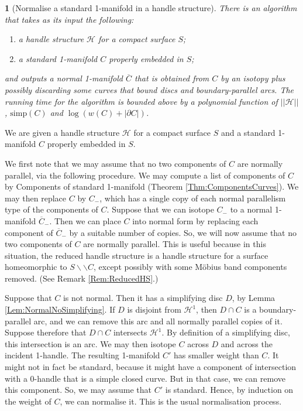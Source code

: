 \documentclass[oneside]{amsart}
\numberwithin{equation}{section}
\theoremstyle{plain}
\newtheorem*{namedtheorem}{\theoremname}
\newcommand{\theoremname}{testing}
\newenvironment{named}[1]{\renewcommand{\theoremname}{#1}\begin{namedtheorem}}{\end{namedtheorem}}
\theoremstyle{definition}
\newcommand{\cut}{\backslash\backslash}
\newcommand{\calH}{\mathcal{H}}
\begin{document}
\begin{named}{Theorem \ref{Thm:Normalise1Manifold}}[{\sc Normalise a standard 1-manifold in a handle structure}]
There is an algorithm that takes as its input the following:
\begin{enumerate}
\item a handle structure $\calH$ for a compact surface $S$;
\item a standard 1-manifold $C$ properly embedded in $S$;
\end{enumerate}
and outputs a normal 1-manifold $\overline{C}$ that is obtained from $C$ by an isotopy plus possibly discarding some curves that bound discs and boundary-parallel arcs. The running time for the algorithm is bounded above by a polynomial function of $||\calH||$, $\mathrm{simp}(C)$ and $\log (w(C) + |\partial C|)$.
\end{named}


We are given a handle structure $\calH$ for a compact surface $S$ and a standard 1-manifold $C$ properly embedded in $S$.

We first note that we may assume that no two components of $C$ are normally parallel, via the following procedure. We may compute a list of components of $C$ by {\sc Components of standard 1-manifold} (Theorem \ref{Thm:ComponentsCurves}). We may then replace $C$ by $C_-$, which has a single copy of each normal parallelism type of the components of $C$. Suppose that we can isotope $C_-$ to a normal 1-manifold $\overline{C}_-$. Then we can place $C$ into normal form by replacing each component of $\overline{C}_-$ by a suitable number of copies. So, we will now assume that no two components of $C$ are normally parallel. This is useful because in this situation, the reduced handle structure is a handle structure for a surface homeomorphic to $S \cut C$, except possibly with some M\"obius band components removed. (See Remark \ref{Rem:ReducedHS}.)


Suppose that $C$ is not normal. Then it has a simplifying disc $D$, by Lemma \ref{Lem:NormalNoSimplifying}. If $D$ is disjoint from $\calH^1$, then $D \cap C$ is a boundary-parallel arc, and we can remove this arc and all normally parallel copies of it. Suppose therefore that $D \cap C$ intersects $\calH^1$. By definition of a simplifying disc, this intersection is an arc. We may then isotope $C$ across $D$ and across the incident 1-handle. The resulting 1-manifold $C'$ has smaller weight than $C$. It might not in fact be standard, because it might have a component of intersection with a 0-handle that is a simple closed curve. But in that case, we can remove this component. So, we may assume that $C'$ is standard. Hence, by induction on the weight of $C$, we can normalise it. This is the usual normalisation process.
\end{document}
